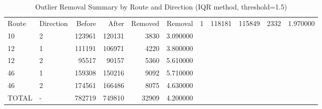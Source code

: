 \begin{table}
\caption{Outlier Removal Summary by Route and Direction (IQR method, threshold=1.5)}
\label{tab:outlier_removal}
\begin{tabular}{llrrrr}
\toprule
Route & Direction & Before & After & Removed & Removal %
 & 1 & 118181 & 115849 & 2332 & 1.970000 \\
10 & 2 & 123961 & 120131 & 3830 & 3.090000 \\
12 & 1 & 111191 & 106971 & 4220 & 3.800000 \\
12 & 2 & 95517 & 90157 & 5360 & 5.610000 \\
46 & 1 & 159308 & 150216 & 9092 & 5.710000 \\
46 & 2 & 174561 & 166486 & 8075 & 4.630000 \\
TOTAL & - & 782719 & 749810 & 32909 & 4.200000 \\
\bottomrule
\end{tabular}
\end{table}
